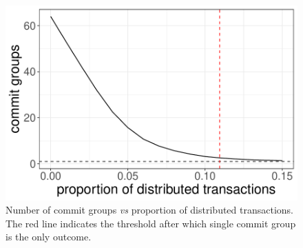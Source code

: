 \begin{figure}[htbp]
  \centering
  \includegraphics[width=0.6\linewidth]{figures/fig-3.pdf}
  \caption{Number of commit groups \textit{vs}  proportion of distributed transactions.
    The red line indicates the threshold after which single commit group is the only outcome.
    }
  \label{fig:3}
\end{figure}